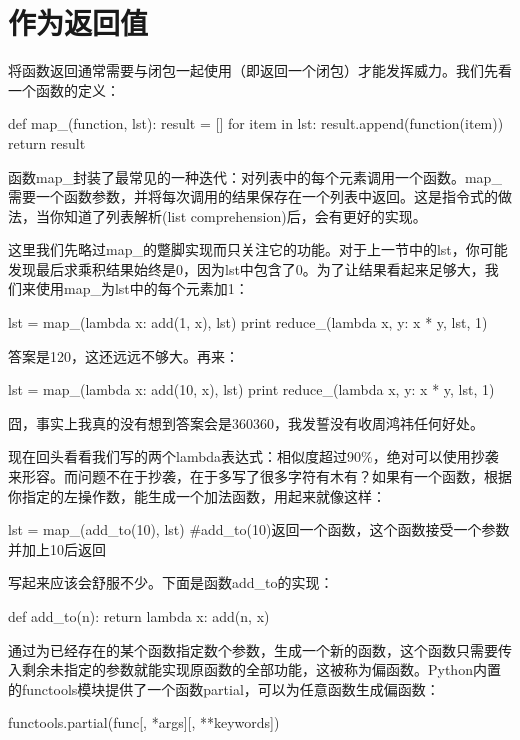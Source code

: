 \documentclass[12pt,a4paper]{report}
\begin{document}
\section{作为返回值}
将函数返回通常需要与闭包一起使用（即返回一个闭包）才能发挥威力。我们先看一个函数的定义：
\begin{python}[moreemph={[4]42},caption={},label=ex1]
def map_(function, lst):
    result = []
    for item in lst:
        result.append(function(item))
    return result
\end{python}

函数map\_封装了最常见的一种迭代：对列表中的每个元素调用一个函数。map\_需要一个函数参数，并将每次调用的结果保存在一个列表中返回。这是指令式的做法，当你知道了列表解析(list comprehension)后，会有更好的实现。

这里我们先略过map\_的蹩脚实现而只关注它的功能。对于上一节中的lst，你可能发现最后求乘积结果始终是0，因为lst中包含了0。为了让结果看起来足够大，我们来使用map\_为lst中的每个元素加1：
\begin{python}[moreemph={[4]42},caption={},label=ex1]
lst = map_(lambda x: add(1, x), lst)
print reduce_(lambda x, y: x * y, lst, 1)
\end{python}

答案是120，这还远远不够大。再来：
\begin{python}[moreemph={[4]42},caption={},label=ex1]
lst = map_(lambda x: add(10, x), lst)
print reduce_(lambda x, y: x * y, lst, 1)
\end{python}

囧，事实上我真的没有想到答案会是360360，我发誓没有收周鸿祎任何好处。

现在回头看看我们写的两个lambda表达式：相似度超过90\%，绝对可以使用抄袭来形容。而问题不在于抄袭，在于多写了很多字符有木有？如果有一个函数，根据你指定的左操作数，能生成一个加法函数，用起来就像这样： 
\begin{python}[moreemph={[4]42},caption={},label=ex1]
lst = map_(add_to(10), lst) #add_to(10)返回一个函数，这个函数接受一个参数并加上10后返回
\end{python}

写起来应该会舒服不少。下面是函数add\_to的实现：
\begin{python}[moreemph={[4]42},caption={},label=ex1]
def add_to(n):
    return lambda x: add(n, x)
\end{python}

通过为已经存在的某个函数指定数个参数，生成一个新的函数，这个函数只需要传入剩余未指定的参数就能实现原函数的全部功能，这被称为偏函数。Python内置的functools模块提供了一个函数partial，可以为任意函数生成偏函数：
\begin{python}[moreemph={[4]42},caption={},label=ex1]
functools.partial(func[, *args][, **keywords])
\end{python}
\end{document}
